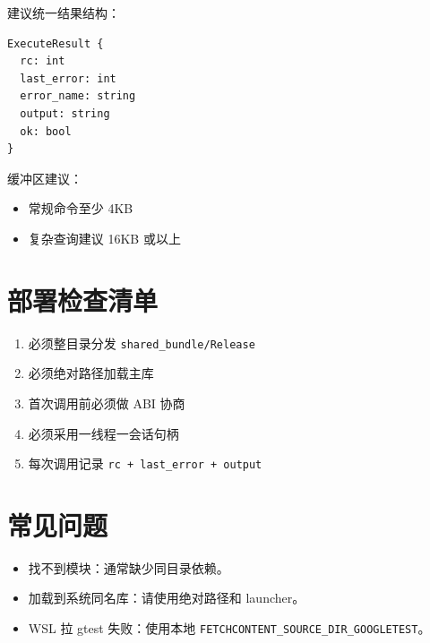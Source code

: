 \documentclass[11pt,a4paper]{ctexart}
\begin{document}
建议统一结果结构：
\begin{lstlisting}
ExecuteResult {
  rc: int
  last_error: int
  error_name: string
  output: string
  ok: bool
}
\end{lstlisting}

缓冲区建议：
\begin{itemize}
  \item 常规命令至少 4KB
  \item 复杂查询建议 16KB 或以上
\end{itemize}

\section{部署检查清单}
\begin{enumerate}
  \item 必须整目录分发 \texttt{shared\_bundle/Release}
  \item 必须绝对路径加载主库
  \item 首次调用前必须做 ABI 协商
  \item 必须采用一线程一会话句柄
  \item 每次调用记录 \texttt{rc + last\_error + output}
\end{enumerate}

\section{常见问题}
\begin{itemize}
  \item 找不到模块：通常缺少同目录依赖。
  \item 加载到系统同名库：请使用绝对路径和 launcher。
  \item WSL 拉 gtest 失败：使用本地
  \texttt{FETCHCONTENT\_SOURCE\_DIR\_GOOGLETEST}。
\end{itemize}
\end{document}

